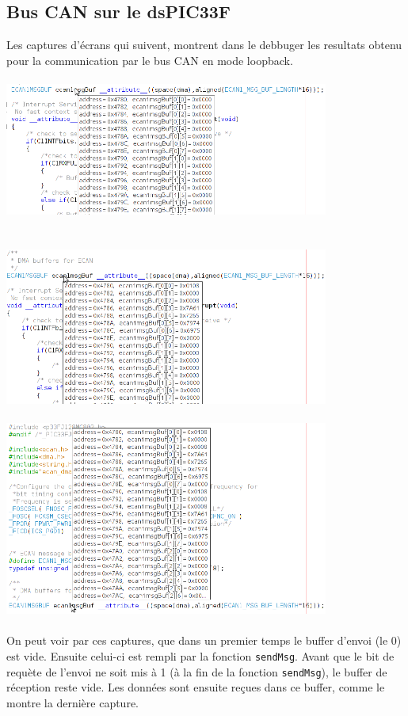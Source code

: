 \documentclass[a4,french,12pt]{article}
\begin{document}
\subsection{Bus CAN sur le dsPIC33F}
Les captures d'écrans qui suivent, montrent dans le debbuger les resultats obtenu pour la communication par le bus CAN en mode 
loopback. \\
\\
\includegraphics[width=0.8\textwidth]{images/CAN_avant_envoi.png}\\
\\
\\
\includegraphics[width=0.8\textwidth]{images/CAN_avant_reception.png}\\
\\
\includegraphics[width=0.8\textwidth]{images/CAN_apres_reception.png}\\
\\
On peut voir par ces captures, que dans un premier temps le buffer d'envoi (le 0) est vide. Ensuite celui-ci est rempli par 
la fonction \texttt{sendMsg}. Avant que le bit de requète de l'envoi ne soit mis à 1 (à la fin de la fonction \texttt{sendMsg}), 
le buffer de réception reste vide. Les données sont ensuite reçues dans ce buffer, comme le montre la dernière capture.
\end{document}
